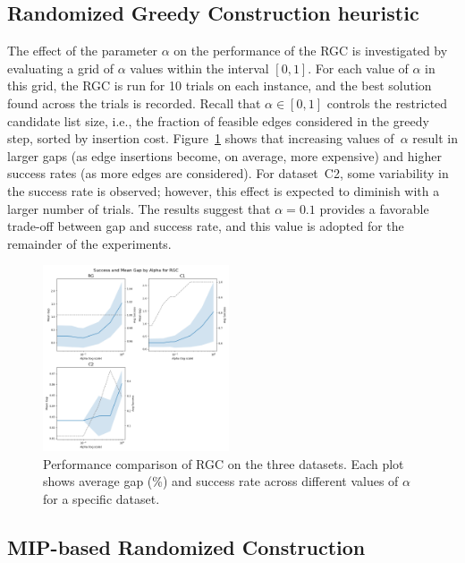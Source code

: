 \documentclass[twocolumn, switch]{article} %
\begin{document}
\subsection{Randomized Greedy Construction heuristic}
The effect of the parameter $\alpha$ on the performance of the RGC is investigated by evaluating a grid of $\alpha$ values within the interval $[0, 1]$. 
For each value of $\alpha$ in this grid, the RGC is run for 10 trials on each instance, and the best solution found across the trials is recorded. 
Recall that $\alpha \in [0, 1]$ controls the restricted candidate list size, i.e., the fraction of feasible edges considered in the greedy step, sorted by insertion cost.
Figure~\ref{fig:alpha_vs_mean_gap_randomized_greedy} shows that increasing values of~$\alpha$ result in larger gaps (as edge insertions become, on average, more expensive) and higher success rates (as more edges are considered). For dataset~C2, some variability in the success rate is observed; however, this effect is expected to diminish with a larger number of trials. The results suggest that $\alpha = 0.1$ provides a favorable trade-off between gap and success rate, and this value is adopted for the remainder of the experiments.

\begin{figure}[h]
    \centering
    \includegraphics[width=0.49\textwidth]{figures/alpha_vs_mean_gap_randomized_greedy.png}
    \caption{Performance comparison of RGC on the three datasets. Each plot shows average gap (\%) and success rate across different values of $\alpha$ for a specific dataset.}
    \label{fig:alpha_vs_mean_gap_randomized_greedy}
\end{figure}


\subsection{MIP-based Randomized Construction}
\end{document}
